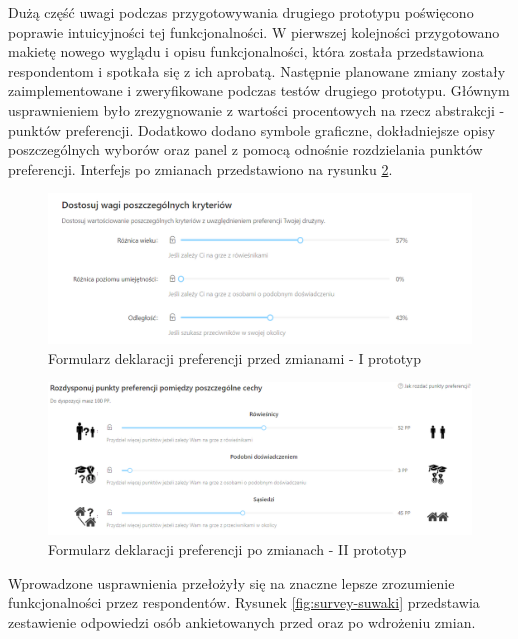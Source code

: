 Dużą część uwagi podczas przygotowywania drugiego prototypu poświęcono poprawie intuicyjności tej funkcjonalności. W pierwszej kolejności przygotowano makietę nowego wyglądu i opisu funkcjonalności, która została przedstawiona respondentom i spotkała się z ich aprobatą. Następnie planowane zmiany zostały zaimplementowane i zweryfikowane podczas testów drugiego prototypu. Głównym usprawnieniem było zrezygnowanie z wartości procentowych na rzecz abstrakcji - punktów preferencji. Dodatkowo dodano symbole graficzne, dokładniejsze opisy poszczególnych wyborów oraz panel z pomocą odnośnie rozdzielania punktów preferencji. Interfejs po zmianach przedstawiono na rysunku \ref{fig:suwaki-aft}. 


\begin{figure}[H]
\centering
\includegraphics[width=\linewidth]{07-walidacja/rys/suwaki_before_close.PNG}
\caption{Formularz deklaracji preferencji przed zmianami - I prototyp}
\label{fig:suwaki-bef}
\end{figure}


\begin{figure}[H]
\centering
\includegraphics[width=\linewidth]{07-walidacja/rys/suwaki_after_close.PNG}
\caption{Formularz deklaracji preferencji po zmianach - II prototyp}
\label{fig:suwaki-aft}
\end{figure}

Wprowadzone usprawnienia przełożyły się na znaczne lepsze zrozumienie funkcjonalności przez respondentów. Rysunek \ref{fig:survey-suwaki} przedstawia zestawienie odpowiedzi osób ankietowanych przed oraz po wdrożeniu zmian.

